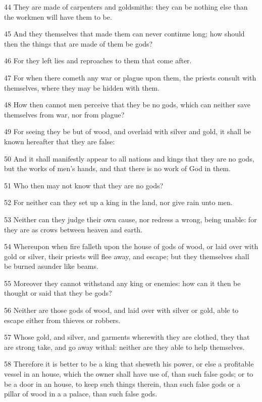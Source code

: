 \par 44 They are made of carpenters and goldsmiths: they can be nothing else than the workmen will have them to be.
\par 45 And they themselves that made them can never continue long; how should then the things that are made of them be gods?
\par 46 For they left lies and reproaches to them that come after.
\par 47 For when there cometh any war or plague upon them, the priests consult with themselves, where they may be hidden with them.
\par 48 How then cannot men perceive that they be no gods, which can neither save themselves from war, nor from plague?
\par 49 For seeing they be but of wood, and overlaid with silver and gold, it shall be known hereafter that they are false:
\par 50 And it shall manifestly appear to all nations and kings that they are no gods, but the works of men's hands, and that there is no work of God in them.
\par 51 Who then may not know that they are no gods?
\par 52 For neither can they set up a king in the land, nor give rain unto men.
\par 53 Neither can they judge their own cause, nor redress a wrong, being unable: for they are as crows between heaven and earth.
\par 54 Whereupon when fire falleth upon the house of gods of wood, or laid over with gold or silver, their priests will flee away, and escape; but they themselves shall be burned asunder like beams.
\par 55 Moreover they cannot withstand any king or enemies: how can it then be thought or said that they be gods?
\par 56 Neither are those gods of wood, and laid over with silver or gold, able to escape either from thieves or robbers.
\par 57 Whose gold, and silver, and garments wherewith they are clothed, they that are strong take, and go away withal: neither are they able to help themselves.
\par 58 Therefore it is better to be a king that sheweth his power, or else a profitable vessel in an house, which the owner shall have use of, than such false gods; or to be a door in an house, to keep such things therein, than such false gods or a pillar of wood in a a palace, than such false gods.
